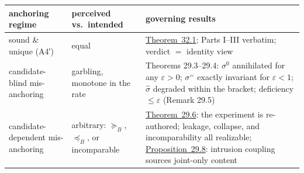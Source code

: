{\def\LTcaptype{none} %
\begin{longtable}[]{@{}
  >{\raggedright\arraybackslash}p{}
  >{\raggedright\arraybackslash}p{}
  >{\raggedright\arraybackslash}p{}@{}}
\toprule\noalign{}
\begin{minipage}[b]{\linewidth}\raggedright
anchoring regime
\end{minipage} & \begin{minipage}[b]{\linewidth}\raggedright
perceived vs.~intended
\end{minipage} & \begin{minipage}[b]{\linewidth}\raggedright
governing results
\end{minipage} \\
\midrule\noalign{}
\endhead
\bottomrule\noalign{}
\endlastfoot
sound \& unique (A4′) & equal & \hyperlink{stmt:32.1}{Theorem~32.1}; Parts I--III verbatim; verdict \(=\) identity view \\
candidate-blind mis-anchoring & garbling, monotone in the rate & Theorems 29.3--29.4: \(\sigma^0\) annihilated for any \(\varepsilon > 0\); \(\sigma^=\) exactly invariant for \(\varepsilon < 1\); \(\widehat\sigma\) degraded within the bracket; deficiency \(\le \varepsilon\) (Remark 29.5) \\
candidate-dependent mis-anchoring & arbitrary: \(\succeq_B\), \(\preceq_B\), or incomparable & \hyperlink{stmt:29.6}{Theorem~29.6}: the experiment is re-authored; leakage, collapse, and incomparability all realizable; \hyperlink{stmt:29.8}{Proposition~29.8}: intrusion coupling sources joint-only content \\
\end{longtable}
}

